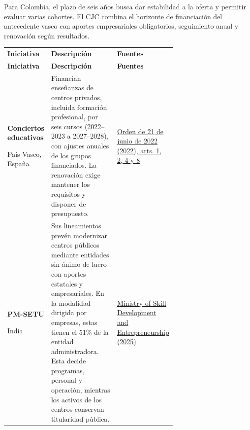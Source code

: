 Para Colombia, el plazo de seis años busca dar estabilidad a la oferta y permitir evaluar varias cohortes. El CJC combina el horizonte de financiación del antecedente vasco con aportes empresariales obligatorios, seguimiento anual y renovación según resultados.

\begingroup
\small
{}
\setlength{\tabcolsep}{4pt}
\renewcommand{\arraystretch}{1.1}
\setlength{\LTpre}{4pt}
\setlength{\LTpost}{6pt}
\begin{longtable}{@{}>{\raggedright\arraybackslash}p{0.22\linewidth}>{\raggedright\arraybackslash}p{0.46\linewidth}>{\raggedright\arraybackslash}p{}@{}}
\multicolumn{3}{@{}l}{\textbf{Referentes internacionales}}\\[3pt]
\toprule
\textbf{Iniciativa} & \textbf{Descripción} & \textbf{Fuentes} \\
\midrule
\endfirsthead
\toprule
\textbf{Iniciativa} & \textbf{Descripción} & \textbf{Fuentes} \\
\midrule
\endhead
\bottomrule
\endfoot
\textbf{Conciertos educativos}\par País Vasco, España & Financian enseñanzas de centros privados, incluida formación profesional, por seis cursos (2022–2023 a 2027–2028), con ajustes anuales de los grupos financiados. La renovación exige mantener los requisitos y disponer de presupuesto. & \href{https://www.euskadi.eus/bopv2/datos/2022/06/2202923a.pdf}{Orden de 21 de junio de 2022 (2022), arts. 1, 2, 4 y 8} \\
\addlinespace[5pt]
\textbf{PM-SETU}\par India & Sus lineamientos prevén modernizar centros públicos mediante entidades sin ánimo de lucro con aportes estatales y empresariales. En la modalidad dirigida por empresas, estas tienen el 51\% de la entidad administradora. Esta decide programas, personal y operación, mientras los activos de los centros conservan titularidad pública. & \href{https://www.msde.gov.in/static/uploads/2026/04/6d3fed46d8d6c01f6035291880f3213c.pdf}{Ministry of Skill Development and Entrepreneurship (2025)} \\
\end{longtable}
\endgroup

